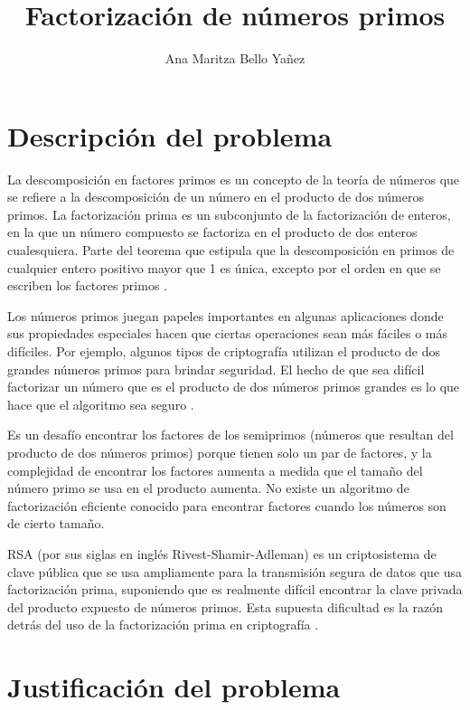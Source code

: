 \documentclass{article}
\begin{document}
\title{Factorización de números primos}
\author{Ana Maritza Bello Yañez}
\maketitle


\section{Descripción del problema}

La descomposición en factores primos es un concepto de la teoría de números que
se refiere a la descomposición de un número en el producto de dos números
primos. La factorización prima es un subconjunto de la factorización de enteros,
en la que un número compuesto se factoriza en el producto de dos enteros
cualesquiera. Parte del teorema que estipula que la descomposición en primos de
cualquier entero positivo mayor que 1 es única, excepto por el orden en que se
escriben los factores primos \cite{lewinter2015elementary}.

Los números primos juegan papeles importantes en algunas aplicaciones donde sus
propiedades especiales hacen que ciertas operaciones sean más fáciles o más
difíciles. Por ejemplo, algunos tipos de criptografía utilizan el producto de
dos grandes números primos para brindar seguridad. El hecho de que sea difícil
factorizar un número que es el producto de dos números primos grandes es lo que
hace que el algoritmo sea seguro \cite{stephens2019essential}.

Es un desafío encontrar los factores de los semiprimos (números que resultan del
producto de dos números primos) porque tienen solo un par de factores, y la
complejidad de encontrar los factores aumenta a medida que el tamaño del número
primo se usa en el producto aumenta. No existe un algoritmo de factorización
eficiente conocido para encontrar factores cuando los números son de cierto
tamaño. 

RSA (por sus siglas en inglés Rivest-Shamir-Adleman) es un criptosistema de
clave pública que se usa ampliamente para la transmisión segura de datos que usa
factorización prima, suponiendo que es realmente difícil encontrar la clave
privada del producto expuesto de números primos. Esta supuesta dificultad es la
razón detrás del uso de la factorización prima en criptografía
\cite{raj2019foundations}.


\section{Justificación del problema}
\end{document}
